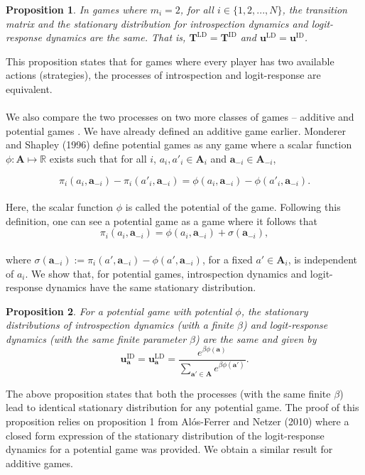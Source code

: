 \documentclass[11pt]{article}
\theoremstyle{plainCl1}
\newtheorem{Prop}{Proposition}
\theoremstyle{plainCl2}
\newcommand{\A}{\mathbf{A}}
\newcommand{\abf}{\mathbf{a}}
\newcommand{\T}{\mathbf{T}}
\newcommand{\ubf}{\mathbf{u}}
\newcommand{\LD}{\mathrm{LD}}
\newcommand{\ID}{\mathrm{ID}}
\begin{document}
\begin{Prop}
In games where $m_i = 2$, for all $i \in \{1,2,...,N\}$, the transition matrix and the stationary distribution for introspection dynamics and logit-response dynamics are the same. That is, $\T^\LD = \T^\ID$ and $\ubf^\LD = \ubf^\ID$.
\label{Prop:2-strategy-logit}
\end{Prop}
\noindent This proposition states that for games where every player has two available actions (strategies), the processes of introspection and logit-response are equivalent. \\ \\ 
\noindent We also compare the two processes on two more classes of games -- additive and potential games \cite{Monderer:GEB:1996}. We have already defined an additive game earlier. Monderer and Shapley (1996) \cite{Monderer:GEB:1996} define potential games as any game where a scalar function $\phi: \A \mapsto \mathbb{R}$ exists such that for all $i$, $a_i, a'_i \in \A_i$ and $\abf_{-i} \in \A_{-i}$, 

\begin{equation}
\pi_i(a_i, \abf_{-i}) - \pi_i(a'_i, \abf_{-i}) = \phi(a_i, \abf_{-i}) - \phi(a'_i, \abf_{-i}).
\label{Eq:potential-game}
\end{equation} \\
\noindent Here, the scalar function $\phi$ is called the potential of the game. Following this definition, one can see a potential game as a game where it follows that
\begin{equation}
\pi_i(a_i, \abf_{-i}) = \phi(a_i, \abf_{-i}) + \sigma(\abf_{-i}),
\label{Eq:potential-game-second-def}
\end{equation} \\
\noindent where $ \sigma(\abf_{-i}) := \pi_i(a', \abf_{-i}) - \phi(a',\abf_{-i})$, for a fixed $a' \in \A_i$, is independent of $a_i$. We show that, for potential games, introspection dynamics and logit-response dynamics have the same stationary distribution.

\begin{Prop} For a potential game with potential $\phi$, the stationary distributions of introspection dynamics (with a finite $\beta$) and logit-response dynamics (with the same finite parameter $\beta$) are the same and given by
\begin{equation}
\ubf^\ID_\abf = \ubf^\LD_\abf = \frac{\displaystyle e^{\beta \phi(\abf)}}{\displaystyle \sum_{\abf' \in \A} e^{\beta \phi(\abf')}}.
\label{Eq:logit-potential-stationary-dist}
\end{equation}
\label{Prop:potential-logit}
\end{Prop}
\noindent The above proposition states that both the processes (with the same finite $\beta$) lead to identical stationary distribution for any potential game. The proof of this proposition relies on proposition 1 from Al\'{o}s-Ferrer and Netzer (2010) \cite{Alos-Ferrer:GEB:2010} where a closed form expression of the stationary distribution of the logit-response dynamics for a potential game was provided. We obtain a similar result for additive games.
\end{document}
